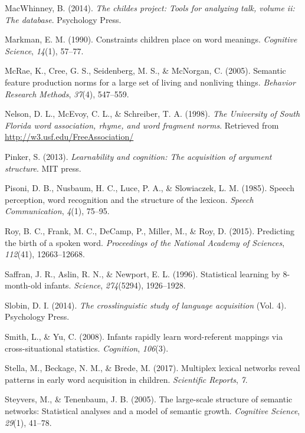 \documentclass[english,floatsintext,man]{apa6}
\theoremstyle{definition}
\theoremstyle{definition}
\theoremstyle{definition}
\theoremstyle{remark}
\begin{document}
\hypertarget{ref-macwhinney2014}{}
MacWhinney, B. (2014). \emph{The childes project: Tools for analyzing
talk, volume ii: The database}. Psychology Press.

\hypertarget{ref-markman90}{}
Markman, E. M. (1990). Constraints children place on word meanings.
\emph{Cognitive Science}, \emph{14}(1), 57--77.

\hypertarget{ref-mcrae2005}{}
McRae, K., Cree, G. S., Seidenberg, M. S., \& McNorgan, C. (2005).
Semantic feature production norms for a large set of living and
nonliving things. \emph{Behavior Research Methods}, \emph{37}(4),
547--559.

\hypertarget{ref-nelson1998}{}
Nelson, D. L., McEvoy, C. L., \& Schreiber, T. A. (1998). \emph{The
University of South Florida word association, rhyme, and word fragment
norms}. Retrieved from \url{http://w3.usf.edu/FreeAssociation/}

\hypertarget{ref-pinker2013}{}
Pinker, S. (2013). \emph{Learnability and cognition: The acquisition of
argument structure}. MIT press.

\hypertarget{ref-pisoni1985}{}
Pisoni, D. B., Nusbaum, H. C., Luce, P. A., \& Slowiaczek, L. M. (1985).
Speech perception, word recognition and the structure of the lexicon.
\emph{Speech Communication}, \emph{4}(1), 75--95.

\hypertarget{ref-roy2015}{}
Roy, B. C., Frank, M. C., DeCamp, P., Miller, M., \& Roy, D. (2015).
Predicting the birth of a spoken word. \emph{Proceedings of the National
Academy of Sciences}, \emph{112}(41), 12663--12668.

\hypertarget{ref-saffran1996}{}
Saffran, J. R., Aslin, R. N., \& Newport, E. L. (1996). Statistical
learning by 8-month-old infants. \emph{Science}, \emph{274}(5294),
1926--1928.

\hypertarget{ref-slobin2014}{}
Slobin, D. I. (2014). \emph{The crosslinguistic study of language
acquisition} (Vol. 4). Psychology Press.

\hypertarget{ref-smith2008}{}
Smith, L., \& Yu, C. (2008). Infants rapidly learn word-referent
mappings via cross-situational statistics. \emph{Cognition},
\emph{106}(3).

\hypertarget{ref-stella2017}{}
Stella, M., Beckage, N. M., \& Brede, M. (2017). Multiplex lexical
networks reveal patterns in early word acquisition in children.
\emph{Scientific Reports}, \emph{7}.

\hypertarget{ref-steyvers2005}{}
Steyvers, M., \& Tenenbaum, J. B. (2005). The large-scale structure of
semantic networks: Statistical analyses and a model of semantic growth.
\emph{Cognitive Science}, \emph{29}(1), 41--78.
\end{document}
